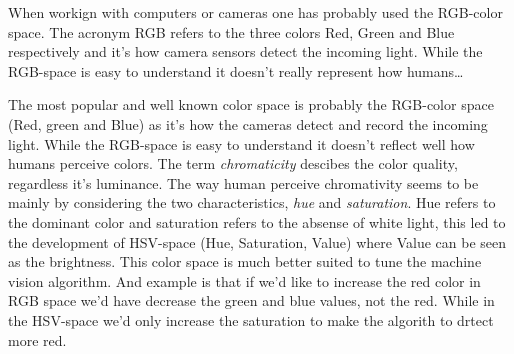 When workign with computers or cameras one has probably used the RGB-color space. The acronym RGB refers to the three colors Red, Green and Blue respectively and it's how camera sensors detect the incoming light. While the RGB-space is easy to understand it doesn't really represent how humans\dots

The most popular and well known color space is probably the RGB-color space (Red, green and Blue) as it's how the cameras detect and record the incoming light. While the RGB-space is easy to understand it doesn't reflect well how humans perceive colors. The term \textit{chromaticity} descibes the color quality, regardless it's luminance. The way human perceive chromativity seems to be mainly by considering the two characteristics, \textit{hue} and \textit{saturation}. Hue refers to the dominant color and saturation refers to the absense of white light, this led to the development of HSV-space (Hue, Saturation, Value) where Value can be seen as the brightness. This color space is much better suited to tune the machine vision algorithm. And example is that if we'd like to increase the red color in RGB space we'd have decrease the green and blue values, not the red. While in the HSV-space we'd only increase the saturation to make the algorith to drtect more red. 

